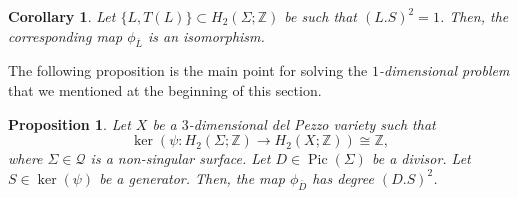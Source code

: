 \documentclass[11pt]{amsart}
\numberwithin{equation}{section}
\theoremstyle{definition}
\theoremstyle{plain}
\newtheorem{proposition}[definition]{Proposition}
\newtheorem{corollary}[definition]{Corollary}
\theoremstyle{remark}
\newcommand{\Z}{\mathbb{Z}}
\DeclareMathOperator{\Pic}{Pic}
\begin{document}
\begin{corollary} \label{coro-isomorphism.pencil.picard}
Let $\{L,T(L)\}\subset H_2(\Sigma;\Z)$ be such that $(L.S)^2=1$. Then, the corresponding map $\phi_{\overline{L}}$ is an isomorphism. 
\end{corollary}

The following proposition is the main point for solving the \textit{$1$-dimensional problem} that we mentioned at the beginning of this section.


\begin{proposition} \label{Prop-degree.case.complex}
  Let $X$ be a $3$-dimensional del Pezzo variety such that
  $$\ker(\psi\colon  H_2(\Sigma;\mathbb{Z})\to H_2(X;\mathbb{Z}))\cong \Z,$$
  where $\Sigma\in \mathcal{Q}$ is a non-singular surface. Let $D\in \Pic(\Sigma)$ be a divisor. Let  $S\in \ker(\psi)$ be a generator.  Then, the map $\phi_{\overline{D}}$ has degree $(D.S)^2$.
\end{proposition} 
\end{document}
